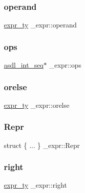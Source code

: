 \mbox{\label{struct__expr_ab27f68df0bce07742004816407b34ce9}} 
\subsubsection{\texorpdfstring{operand}{operand}}
{\footnotesize\ttfamily \mbox{\hyperlink{_python-ast_8h_a56d3705e020a071405094a220c4592bd}{expr\+\_\+ty}} \+\_\+expr\+::operand}

\mbox{\label{struct__expr_a67c65cbe747db86cb97b5c8cd803ac12}} 
\subsubsection{\texorpdfstring{ops}{ops}}
{\footnotesize\ttfamily \mbox{\hyperlink{structasdl__int__seq}{asdl\+\_\+int\+\_\+seq}}$\ast$ \+\_\+expr\+::ops}

\mbox{\label{struct__expr_a2c9d3108e3e7d0d1068d97bc23958c20}} 
\subsubsection{\texorpdfstring{orelse}{orelse}}
{\footnotesize\ttfamily \mbox{\hyperlink{_python-ast_8h_a56d3705e020a071405094a220c4592bd}{expr\+\_\+ty}} \+\_\+expr\+::orelse}

\mbox{\label{struct__expr_afc24c0dc26cc7c35f352a6c2d4309736}} 
\subsubsection{\texorpdfstring{Repr}{Repr}}
{\footnotesize\ttfamily struct \{ ... \}   \+\_\+expr\+::\+Repr}

\mbox{\label{struct__expr_a710aaab4ce6f94cd332448a7e895111f}} 
\subsubsection{\texorpdfstring{right}{right}}
{\footnotesize\ttfamily \mbox{\hyperlink{_python-ast_8h_a56d3705e020a071405094a220c4592bd}{expr\+\_\+ty}} \+\_\+expr\+::right}

